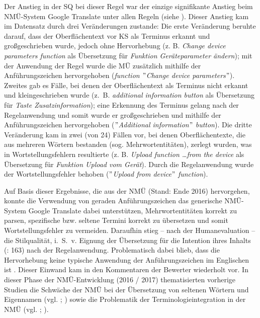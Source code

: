 Der Anstieg in der SQ bei dieser Regel war der einzige signifikante Anstieg beim NMÜ-System Google Translate unter allen Regeln (siehe ). Dieser Anstieg kam im Datensatz durch drei Veränderungen zustande: Die erste Veränderung beruhte darauf, dass der Oberflächentext vor KS als Terminus erkannt und großgeschrieben wurde, jedoch ohne Hervorhebung (z. B. \textit{Change device parameters function} als Übersetzung für \textit{Funktion Geräteparameter ändern}); mit der Anwendung der Regel wurde die MÜ zusätzlich mithilfe der Anführungszeichen hervorgehoben (\textit{function $"$Change device parameters$"$}). Zweites gab es Fälle, bei denen der Oberflächentext als Terminus nicht erkannt und kleingeschrieben wurde (z.~B. \textit{additional information button} als Übersetzung für \textit{Taste Zusatzinformation}); eine Erkennung des Terminus gelang nach der Regelanwendung und somit wurde er großgeschrieben und mithilfe der Anführungszeichen hervorgehoben (\textit{$"$Additional information$"$ button}). Die dritte Veränderung kam in zwei (von 24) Fällen vor, bei denen Oberflächentexte, die aus mehreren Wörtern bestanden (sog. Mehrwortentitäten), zerlegt wurden, was in Wortstellungsfehlern resultierte (z. B. \textit{Upload function \ldots from the device} als Übersetzung für \textit{Funktion Upload vom Gerät}). Durch die Regelanwendung wurde der Wortstellungsfehler behoben (\textit{$"$Upload from device$"$ function}).

Auf Basis dieser Ergebnisse, die aus der NMÜ (Stand: Ende 2016) hervorgehen, konnte die Verwendung von geraden Anführungszeichen das generische NMÜ-System Google Translate dabei unterstützen, Mehrwortentitäten korrekt zu parsen, spezifische bzw. seltene Termini korrekt zu übersetzen und somit Wortstellungsfehler zu vermeiden. Daraufhin stieg -- nach der Humanevaluation -- die Stilqualität, i.~S.~v. Eignung der Übersetzung für die Intention ihres Inhalts (\citealt{HutchinsSomers1992}: 163) nach der Regelanwendung. Problematisch dabei blieb, dass die Hervorhebung keine typische Anwendung der Anführungszeichen im Englischen ist \citep{McMurrey2006}. Dieser Einwand kam in den Kommentaren der Bewerter wiederholt vor. In dieser Phase der NMÜ-Entwicklung (2016 / 2017) thematisierten vorherige Studien die Schwäche der NMÜ bei der Übersetzung von seltenen Wörtern und Eigennamen (vgl. \citealt{LeSchuster2016}; \citealt{Köhn2017}) sowie die Problematik der Terminologieintegration in der NMÜ (vgl. \citealt{Eisold2017}; \citealt{Köhn2017}).

